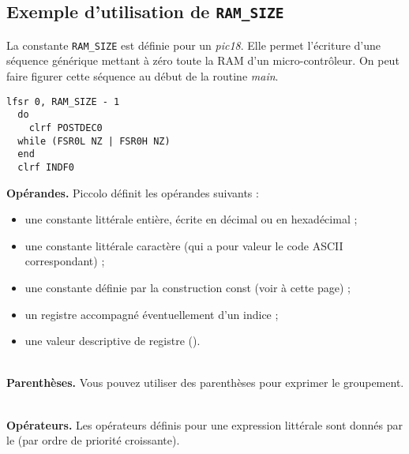 \subsection{Exemple d'utilisation de \texttt{RAM\_SIZE}}

La constante \texttt{RAM\_SIZE} est définie pour un \emph{pic18}. Elle permet l'écriture d'une séquence générique mettant à zéro toute la RAM d'un micro-contrôleur. On peut faire figurer cette séquence au début de la routine \emph{main}.


\begin{lstlisting}[language=piccolo]
  lfsr 0, RAM_SIZE - 1
  do
    clrf POSTDEC0
  while (FSR0L NZ | FSR0H NZ)
  end
  clrf INDF0
\end{lstlisting}



\textbf{Opérandes.} Piccolo définit les opérandes suivants :
\begin{itemize}
  \item une constante littérale entière, écrite en décimal ou en hexadécimal ;
  \item une constante littérale caractère (qui a pour valeur le code ASCII correspondant) ;
  \item une constante définie par la construction const (voir à cette page) ;
  \item un registre accompagné éventuellement d’un indice ;
  \item une valeur descriptive de registre ().
\end{itemize}

~\\
\textbf{Parenthèses.} Vous pouvez utiliser des parenthèses pour exprimer le groupement.

~\\
\textbf{Opérateurs.} Les opérateurs définis pour une expression littérale sont donnés par le  (par ordre de priorité croissante).

